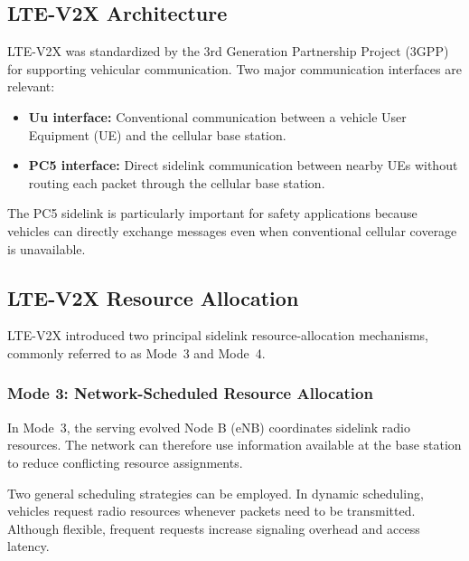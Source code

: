 \subsection{LTE-V2X Architecture}

LTE-V2X was standardized by the 3rd Generation Partnership Project (3GPP)
for supporting vehicular communication. Two major communication interfaces
are relevant:

\begin{itemize}
    \item \textbf{Uu interface:} Conventional communication between a vehicle
    User Equipment (UE) and the cellular base station.

    \item \textbf{PC5 interface:} Direct sidelink communication between
    nearby UEs without routing each packet through the cellular base station.
\end{itemize}

The PC5 sidelink is particularly important for safety applications because
vehicles can directly exchange messages even when conventional cellular
coverage is unavailable.

\subsection{LTE-V2X Resource Allocation}

LTE-V2X introduced two principal sidelink resource-allocation mechanisms,
commonly referred to as Mode~3 and Mode~4.

\subsubsection{Mode 3: Network-Scheduled Resource Allocation}

In Mode~3, the serving evolved Node B (eNB) coordinates sidelink radio
resources. The network can therefore use information available at the base
station to reduce conflicting resource assignments.

Two general scheduling strategies can be employed. In dynamic scheduling,
vehicles request radio resources whenever packets need to be transmitted.
Although flexible, frequent requests increase signaling overhead and access
latency.

